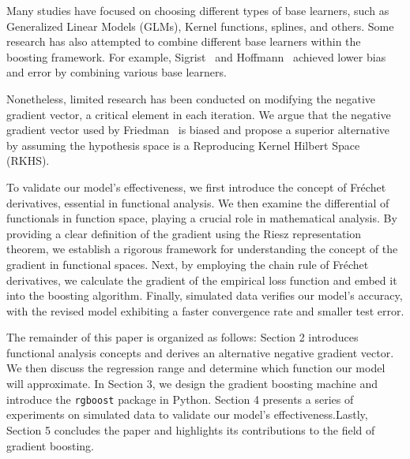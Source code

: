 Many studies have focused on choosing different types of base learners, such as Generalized Linear Models (GLMs), Kernel functions, splines, and others. Some research has also attempted to combine different base learners within the boosting framework. For example, Sigrist~\cite{sigrist2021ktboost} and Hoffmann~\cite{hoffmann2004combining} achieved lower bias and error by combining various base learners.

Nonetheless, limited research has been conducted on modifying the negative gradient vector, a critical element in each iteration. We argue that the negative gradient vector used by Friedman~\cite{friedman2001greedy} is biased and propose a superior alternative by assuming the hypothesis space is a Reproducing Kernel Hilbert Space (RKHS).

To validate our model's effectiveness, we first introduce the concept of Fréchet derivatives, essential in functional analysis. We then examine the differential of functionals in function space, playing a crucial role in mathematical analysis. By providing a clear definition of the gradient using the Riesz representation theorem, we establish a rigorous framework for understanding the concept of the gradient in functional spaces. Next, by employing the chain rule of Fréchet derivatives, we calculate the gradient of the empirical loss function and embed it into the boosting algorithm. Finally, simulated data verifies our model's accuracy, with the revised model exhibiting a faster convergence rate and smaller test error.

The remainder of this paper is organized as follows: Section 2 introduces functional analysis concepts and derives an alternative negative gradient vector. We then discuss the regression range and determine which function our model will approximate. In Section 3, we design the gradient boosting machine and introduce the \texttt{rgboost} package in Python. Section 4 presents a series of experiments on simulated data to validate our model's effectiveness.Lastly, Section 5 concludes the paper and highlights its contributions to the field of gradient boosting.